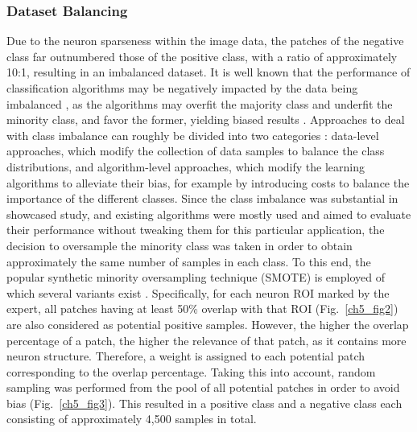 \subsubsection{Dataset Balancing}
\label{sec:balanced}
Due to the neuron sparseness within the image data, the patches of the negative class far outnumbered those of the positive class, with a ratio of approximately 10:1, resulting in an imbalanced dataset. It is well known that the performance of classification algorithms may be negatively impacted by the data being imbalanced \cite{chawla2004editorial, daskalaki2006evaluation, forman2010apples, branco2016survey}, as the algorithms may overfit the majority class and underfit the minority class, and favor the former, yielding biased results \cite{garcia2014bias, li2018adaptive}. Approaches to deal with class imbalance can roughly be divided into two categories \cite{he2008learning, krawczyk2016learning, haixiang2017learning}: data-level approaches, which modify the collection of data samples to balance the class distributions, and algorithm-level approaches, which modify the learning algorithms to alleviate their bias, for example by introducing costs to balance the importance of the different classes. Since the class imbalance was substantial in showcased study, and existing algorithms were mostly used and aimed to evaluate their performance without tweaking them for this particular application, the decision to oversample the minority class was taken in order to obtain approximately the same number of samples in each class. To this end, the popular synthetic minority oversampling technique (SMOTE) is employed \cite{chawla2002smote} of which several variants exist \cite{saez2015smote, krawczyk2016learning, gosain2017handling}. Specifically, for each neuron ROI marked by the expert, all patches having at least 50\% overlap with that ROI (Fig.~\ref{ch5_fig2}) are also considered as potential positive samples. However, the higher the overlap percentage of a patch, the higher the relevance of that patch, as it contains more neuron structure. Therefore, a weight is assigned to each potential patch corresponding to the overlap percentage. Taking this into account, random sampling was performed from the pool of all potential patches in order to avoid bias (Fig.~\ref{ch5_fig3}). This resulted in a positive class and a negative class each consisting of approximately 4,500 samples in total.
